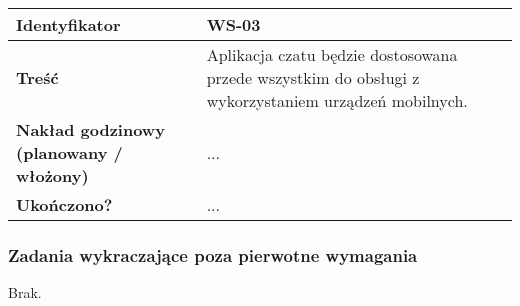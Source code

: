 \begin{tabular}{ | l | l | }
	\hline
		\textbf{Identyfikator} &
	WS-03
		\\

	\hline
		\textbf{Treść} & \parbox[t]{11.5cm}{
			Aplikacja czatu będzie dostosowana przede wszystkim
			do obsługi z wykorzystaniem urządzeń mobilnych.
		}\\

	\hline      \parbox[t]{4cm}{\textbf{Nakład godzinowy (planowany / włożony)}} &
        \parbox[t]{11.5cm}{\strut
          ...
        \strut}\\

        \hline
          \parbox[t]{4cm}{\textbf{Ukończono?}} &
          \parbox[t]{11.5cm}{\strut
            ...
          \strut}\\
  	\hline
\end{tabular}

\subsubsection{Zadania wykraczające poza pierwotne wymagania}

Brak.
